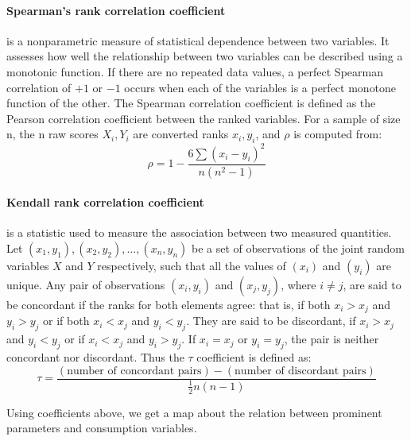     \paragraph{Spearman's rank correlation coefficient} is a nonparametric measure of statistical dependence between two variables. It assesses how well the relationship between two variables can be described using a monotonic function. If there are no repeated data values, a perfect Spearman correlation of $+1$ or $-1$ occurs when each of the variables is a perfect monotone function of the other\cite{Spearman}\cite{spearmanr}. The Spearman correlation coefficient is defined as the Pearson correlation coefficient between the ranked variables\cite{ranked variable}. For a sample of size n, the n raw scores $X_i,Y_i$ are converted ranks $x_i, y_i$, and $\rho$ is computed from:
    $$
    \rho = 1 - \frac{6\sum{(x_i-y_i)^2}}{n(n^2-1)}
    $$

    \paragraph{Kendall rank correlation coefficient} is a statistic used to measure the association between two measured quantities. Let $(x_1, y_1),(x_2, y_2),\dots,(x_n, y_n)$ be a set of observations of the joint random variables $X$ and $Y$ respectively, such that all the values of $(x_i)$ and $(y_i)$ are unique. Any pair of observations $(x_i,y_i)$ and $(x_j, y_j)$, where $i\neq j$, are said to be concordant if the ranks for both elements agree: that is, if both $x_i > x_j$ and $y_i > y_j$ or if both $x_i < x_j$ and $y_i < y_j$. They are said to be discordant, if $x_i > x_j$ and $y_i < y_j$ or if $x_i < x_j$ and $y_i > y_j$. If $x_i = x_j$ or $y_i = y_j$, the pair is neither concordant nor discordant. Thus the $\tau$ coefficient is defined as\cite{Kendall}\cite{kendalltau}:
    $$
    \tau = \frac{(\text{number of concordant pairs}) - (\text{number of discordant pairs})}{\frac{1}{2} n (n-1)}
    $$

    Using coefficients above, we get a map about the relation between prominent parameters and consumption variables.

